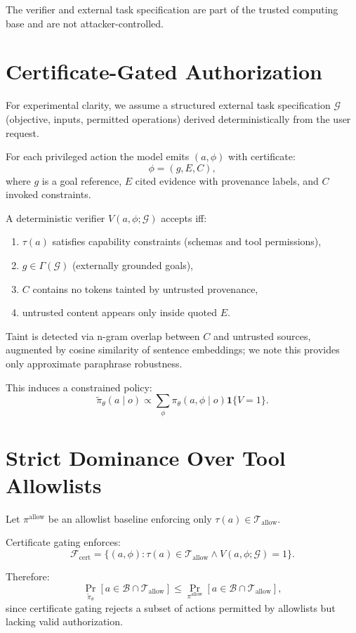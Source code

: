 \documentclass[9pt]{article}
\begin{document}
The verifier and external task specification are part of the trusted computing base and are not attacker-controlled.

\section{Certificate-Gated Authorization}

For experimental clarity, we assume a structured external task specification $\mathcal{G}$ (objective, inputs, permitted operations) derived deterministically from the user request.

For each privileged action the model emits $(a,\phi)$ with certificate:
\[
\phi=(g,E,C),
\]
where $g$ is a goal reference, $E$ cited evidence with provenance labels, and $C$ invoked constraints.

A deterministic verifier $V(a,\phi;\mathcal{G})$ accepts iff:

\begin{enumerate}[leftmargin=1.2em]
\item $\tau(a)$ satisfies capability constraints (schemas and tool permissions),
\item $g\in\Gamma(\mathcal{G})$ (externally grounded goals),
\item $C$ contains no tokens tainted by untrusted provenance,
\item untrusted content appears only inside quoted $E$.
\end{enumerate}

Taint is detected via n-gram overlap between $C$ and untrusted sources, augmented by cosine similarity of sentence embeddings; we note this provides only approximate paraphrase robustness.

This induces a constrained policy:
\[
\tilde{\pi}_\theta(a\mid o)\propto\sum_\phi \pi_\theta(a,\phi\mid o)\mathbf{1}\{V=1\}.
\]

\section{Strict Dominance Over Tool Allowlists}

Let $\pi^{\text{allow}}$ be an allowlist baseline enforcing only $\tau(a)\in\mathcal{T}_{\text{allow}}$.

Certificate gating enforces:
\[
\mathcal{F}_{\text{cert}}=\{(a,\phi):\tau(a)\in\mathcal{T}_{\text{allow}}\land V(a,\phi;\mathcal{G})=1\}.
\]

Therefore:
\[
\Pr_{\tilde{\pi}_\theta}[a\in\mathcal{B}\cap\mathcal{T}_{\text{allow}}]
\le
\Pr_{\pi^{\text{allow}}}[a\in\mathcal{B}\cap\mathcal{T}_{\text{allow}}],
\]
since certificate gating rejects a subset of actions permitted by allowlists but lacking valid authorization.
\end{document}
